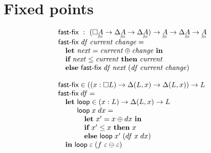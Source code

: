 \documentclass{article}
\begin{document}




\section{Fixed points}

\[\begin{array}{l}
  \textsf{fast-fix} ~:~
  (\Disc{\fixtype{A}} \to \Delta\fixtype{A} \to \Delta\fixtype{A})
  \to \fixtype{A} \to \Delta\fixtype{A} \to \fixtype{A}\\
  \textsf{fast-fix}\; \mi{df}\; \mi{current}\; \mi{change} =\\
  \quad \textbf{let}~ {\mi{next} = \mi{current} \oplus \mi{change}}
  ~\textbf{in}\\
  \quad \textbf{if}~ \mi{next} \le \mi{current}
  ~\textbf{then}~ \mi{current}\\
  \quad \textbf{else}~ \textsf{fast-fix}\; \mi{df}\; \mi{next}
  \;(\mi{df}\; \mi{current}\; \mi{change})\\
  \\
  \textsf{fast-fix}
  \in ((x : \Disc{L}) \to \Delta(L, x) \to \Delta(L, x)) \to L
  \\
  \textsf{fast-fix} \; df =\\
  \quad\textbf{let}~ \textsf{loop} \in (x : L) \to \Delta(L, x) \to L\\
  \quad\phantom{\textbf{let}~} \textsf{loop} \;x \;dx =\\
  \quad\phantom{\textbf{let}~}\quad
  \textbf{let}~ x' = x \oplus dx ~\textbf{in}\\
  \quad\phantom{\textbf{let}~}\quad
  \textbf{if}~ x' \le x ~\textbf{then}~ x\\
  \quad\phantom{\textbf{let}~}\quad
  \textbf{else}~\textsf{loop} \;x' \;(df \; x \; dx)\\
  \quad\textbf{in}~ \textsf{loop} \; \unit \; (f \; \unit \ominus \unit)
\end{array}\]
\end{document}
